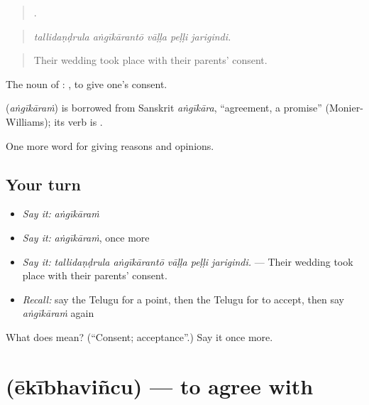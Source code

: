 \begin{quote}
    .
\end{quote}

\begin{quote}
\emph{tallidaṇḍrula aṅgīkārantō vāḷḷa peḷḷi jarigindi.}
\end{quote}

\begin{quote}
Their wedding took place with their parents’ consent.
\end{quote}

The noun of :  , to give one’s consent.

\begin{cousinweb}
\textbf{} (\emph{aṅgīkāraṁ}) is borrowed from Sanskrit \emph{aṅgīkāra}, \textquotedblleft{}agreement, a promise\textquotedblright{} (Monier-Williams); its verb is .
\end{cousinweb}

\begin{grammarlens}[title={What you've built}]
One more word for giving reasons and opinions.
\end{grammarlens}

\subsection*{Your turn}
\begin{itemize}
\raggedright
  \item \emph{Say it:} \emph{aṅgīkāraṁ}
  \item \emph{Say it:} \emph{aṅgīkāraṁ}, once more
  \item \emph{Say it:} \emph{tallidaṇḍrula aṅgīkārantō vāḷḷa peḷḷi jarigindi.} — Their wedding took place with their parents’ consent.
  \item \emph{Recall:} say the Telugu for a point, then the Telugu for to accept, then say \emph{aṅgīkāraṁ} again
\end{itemize}

\begin{tcolorbox}[breakable,colback=teal!4,colframe=teal!35!black,title={Before you move on}]
What does  mean? (\textquotedblleft{}Consent; acceptance\textquotedblright{}.) Say it once more.
\end{tcolorbox}
\section[\texorpdfstring{\te{ఏకీభవించు} (ēkībhaviñcu)}{ఏకీభవించు (ēkībhaviñcu)}]{ (ēkībhaviñcu) — to agree with}


